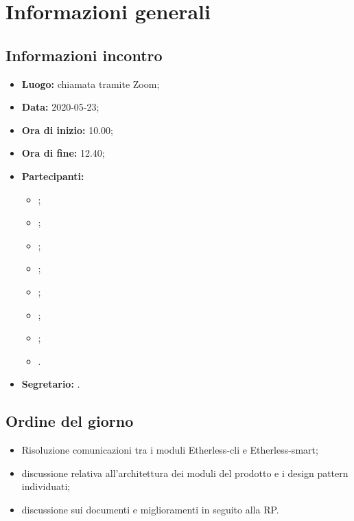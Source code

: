 \section{Informazioni generali}
\subsection{Informazioni incontro}
\begin{itemize}
	\item \textbf{Luogo:} chiamata tramite Zoom;
	\item \textbf{Data:} 2020-05-23;
	\item \textbf{Ora di inizio:} 10.00;
	\item \textbf{Ora di fine:} 12.40;
	\item \textbf{Partecipanti:}
		\begin{itemize}
			\item \VB;
			\item \LB;
			\item \NF;
			\item \EG;
			\item \FJ;
			\item \MP;
			\item \AS;
			\item \AZ.
		\end{itemize}
	\item \textbf{Segretario:} \FJ.
\end{itemize}

\subsection{Ordine del giorno}
\begin{itemize}
	\item Risoluzione comunicazioni tra i moduli Etherless-cli e Etherless-smart;
	\item discussione relativa all'architettura dei moduli del prodotto e i design pattern individuati;
	\item discussione sui documenti e miglioramenti in seguito alla RP.
\end{itemize}

